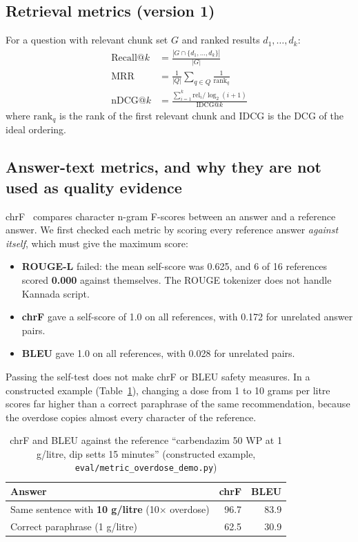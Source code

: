 \subsection{Retrieval metrics (version 1)}
For a question with relevant chunk set $G$ and ranked results $d_1,\dots,d_k$:
\begin{align}
  \text{Recall@}k &= \frac{|G\cap\{d_1,\dots,d_k\}|}{|G|}\\
  \text{MRR} &= \frac{1}{|Q|}\sum_{q\in Q}\frac{1}{\mathrm{rank}_q}\\
  \text{nDCG@}k &= \frac{\sum_{i=1}^{k} \mathrm{rel}_i/\log_2(i+1)}{\mathrm{IDCG@}k}
\end{align}
where $\mathrm{rank}_q$ is the rank of the first relevant chunk and IDCG is the DCG of the
ideal ordering.

\subsection{Answer-text metrics, and why they are not used as quality evidence}
\label{sec:metric-failures}
chrF~\cite{popovic2015chrf} compares character n-gram F-scores between an answer and a reference answer. We
first checked each metric by scoring every reference answer \emph{against itself}, which
must give the maximum score:
\begin{itemize}
  \item \textbf{ROUGE-L} failed: the mean self-score was 0.625, and 6 of 16 references scored
    \textbf{0.000} against themselves. The ROUGE tokenizer does not handle Kannada script.
  \item \textbf{chrF} gave a self-score of 1.0 on all references, with 0.172 for unrelated
    answer pairs.
  \item \textbf{BLEU} gave 1.0 on all references, with 0.028 for unrelated pairs.
\end{itemize}
Passing the self-test does not make chrF or BLEU safety measures. In a constructed example
(Table~\ref{tab:overdose}), changing a dose from 1 to 10 grams per litre scores far
higher than a correct paraphrase of the same recommendation, because the overdose copies
almost every character of the reference.

\begin{table}[h]
\centering
\caption{chrF and BLEU against the reference ``carbendazim 50 WP at 1 g/litre, dip setts 15
minutes'' (constructed example, \texttt{eval/metric\_overdose\_demo.py})}
\label{tab:overdose}
\begin{tabular}{lrr}
\toprule
Answer & chrF & BLEU\\
\midrule
Same sentence with \textbf{10 g/litre} (10$\times$ overdose) & 96.7 & 83.9\\
Correct paraphrase (1 g/litre) & 62.5 & 30.9\\
\bottomrule
\end{tabular}
\end{table}

